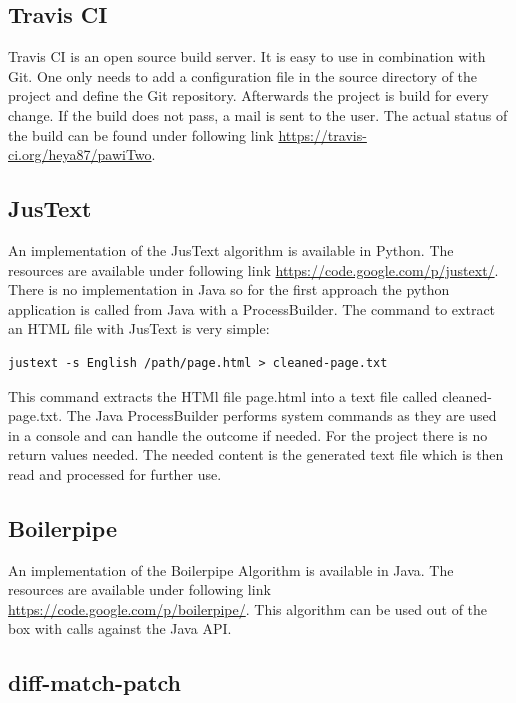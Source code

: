 \subsection{Travis CI}

Travis CI is an open source build server. It is easy to use in combination with Git. One only needs to add a configuration file in the source directory of the project and define the Git repository. Afterwards the project is build for every change. If the build does not pass, a mail is sent to the user. The actual status of the build can be found under following link \url{https://travis-ci.org/heya87/pawiTwo}.

\subsection{JusText}

An implementation of the JusText algorithm is available in Python. The resources are available under following link \url{https://code.google.com/p/justext/}. There is no implementation in Java so for the first approach the python application is called from Java with a ProcessBuilder.
The command to extract an HTML file with JusText is very simple:

\begin {lstlisting}
justext -s English /path/page.html > cleaned-page.txt
\end{lstlisting}

This command extracts the HTMl file page.html into a text file called cleaned-page.txt. The Java ProcessBuilder performs system commands as they are used in a console and can handle the outcome if needed. For the project there is no return values needed. The needed content is the generated text file which is then read and processed for further use.

\subsection{Boilerpipe}

An implementation of the Boilerpipe Algorithm is available in Java. The resources are available under following link \url{https://code.google.com/p/boilerpipe/}. This algorithm can be used out of the box with calls against the Java API.

\subsection{diff-match-patch}

